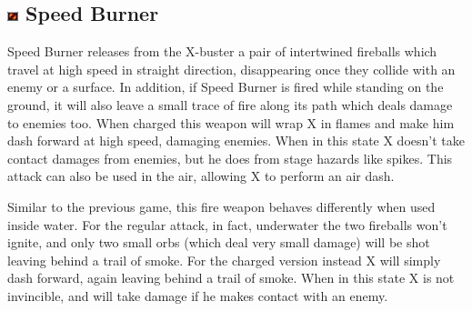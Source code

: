 \subsection{\includegraphics[width=12px, height=10px]{figures/X2/weapons/S_burner.png} Speed Burner}\label{Speed_burner}
Speed Burner releases from the X-buster a pair of intertwined fireballs which travel at high speed in straight direction, disappearing once they collide with an enemy or a surface. In addition, if Speed Burner is fired while standing on the ground, it will also leave a small trace of fire along its path which deals damage to enemies too. When charged this weapon will wrap X in flames and make him dash forward at high speed, damaging enemies. When in this state X doesn't take contact damages from enemies, but he does from stage hazards like spikes. This attack can also be used in the air, allowing X to perform an air dash.

Similar to the previous game, this fire weapon behaves differently when used inside water. For the regular attack, in fact, underwater the two fireballs won't ignite, and only two small orbs (which deal very small damage) will be shot leaving behind a trail of smoke. For the charged version instead X will simply dash forward, again leaving behind a trail of smoke. When in this state X is not invincible, and will take damage if he makes contact with an enemy.

